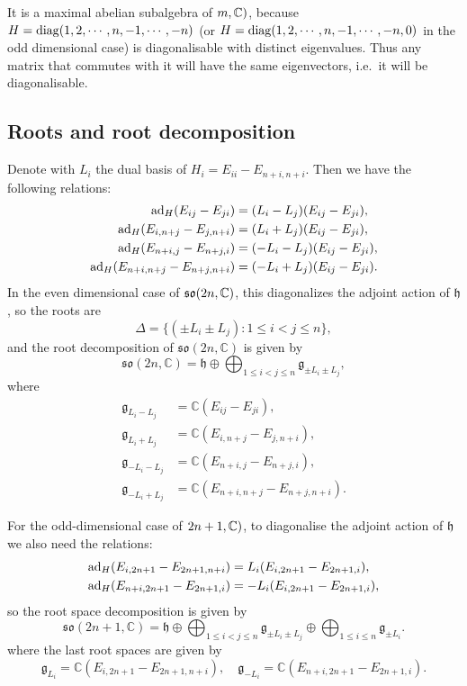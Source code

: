 \documentclass{report}
\begin{document}
It is a maximal abelian subalgebra of $\so(m, \mathbb C)$, because $H = \operatorname{diag}(1, 2, \cdots, n, -1, \cdots, -n)$ (or $ H = \operatorname{diag}(1, 2, \cdots, n, -1, \cdots, -n, 0)$ in the odd dimensional case) is diagonalisable with distinct eigenvalues.
Thus any matrix that commutes with it will have the same eigenvectors, i.e.\ it will be diagonalisable.

\subsection{Roots and root decomposition}
Denote with $L_i$ the dual basis of $H_i = E_{ii} - E_{n+i,n+i}$.
Then we have the following relations:
\begin{align*}
    \operatorname{ad}_{H}(E_{ij} - E_{ji}) &= (L_i - L_j)(E_{ij} - E_{ji}),\\
    \operatorname{ad}_{H}(E_{i,n+j} - E_{j,n+i}) &= (L_i + L_j)(E_{ij} - E_{ji}),\\
    \operatorname{ad}_{H}(E_{n+i,j} - E_{n+j,i}) &= (-L_i - L_j)(E_{ij} - E_{ji}),\\
    \operatorname{ad}_{H}(E_{n+i,n+j} - E_{n+j,n+i}) &= (-L_i + L_j)(E_{ij} - E_{ji}).
\end{align*}
In the even dimensional case of $\operatorname{{\mathfrak{so}}}(2n, \mathbb C)$, this diagonalizes the adjoint action of $\mathfrak h$, so the roots are
\[
\Delta = \{ (\pm L_i \pm L_j) : 1 \leq i < j \leq n \},
\]
and the root decomposition of $\mathfrak{so}(2n, \mathbb C)$ is given by
\[
\mathfrak{so}(2n,\mathbb C) = \mathfrak h \oplus \bigoplus_{1 \leq i < j \leq n} \mathfrak g_{\pm L_i \pm L_j},
\]
where
\begin{align*}
    \mathfrak g_{L_i - L_j} &= \mathbb C \left( E_{ij} - E_{ji} \right),\\
    \mathfrak g_{L_i + L_j} &= \mathbb C \left( E_{i,n+j} - E_{j,n+i} \right),\\
    \mathfrak g_{-L_i - L_j} &= \mathbb C \left( E_{n+i,j} - E_{n+j,i} \right),\\
    \mathfrak g_{-L_i + L_j} &= \mathbb C \left( E_{n+i,n+j} - E_{n+j,n+i} \right).
\end{align*}

For the odd-dimensional case of $\so(2n+1, \mathbb C)$, to diagonalise the adjoint action of $\mathfrak h$ we also need the relations:
\begin{align*}
    \operatorname{ad}_{H}(E_{i,2n+1} - E_{2n+1,n+i}) &= L_i(E_{i,2n+1} - E_{2n+1,i}),\\
    \operatorname{ad}_{H}(E_{n+i,2n+1} - E_{2n+1,i}) &= -L_i(E_{i,2n+1} - E_{2n+1,i}),\\
\end{align*}
so the root space decomposition is given by
\[
    \mathfrak{so}(2n+1,\mathbb C) = \mathfrak h \oplus \bigoplus_{1 \leq i < j \leq n} \mathfrak g_{\pm L_i \pm L_j} \oplus \bigoplus_{1 \leq i \leq n} \mathfrak g_{\pm L_i}.
\]
where the last root spaces are given by
\[
\mathfrak g_{L_i} = \mathbb C \left( E_{i,2n+1} - E_{2n+1,n+i} \right), \quad \mathfrak g_{-L_i} = \mathbb C \left( E_{n+i,2n+1} - E_{2n+1,i} \right).
\]
\end{document}
